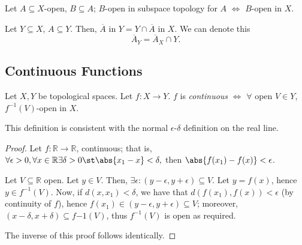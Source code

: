 \begin{lemma}
    Let $A \subseteq X$-open, $B \subseteq A$; $B$-open in subspace topology for $A$ $\iff$ $B$-open in $X$.
\end{lemma}

\begin{lemma}
    Let $Y \subseteq X$, $A\subseteq Y$. Then, $\overline{A}$ in $Y = Y \cap \overline{A}$ in $X$. We can denote this \[
    \overline{A}_Y = \overline{A}_X  \cap Y.   
    \]
\end{lemma}

\subsection{Continuous Functions}

\begin{definition}
    Let $X, Y$ be topological spaces. Let $f: X \to Y$. $f$ is \emph{continuous} $\iff$ $\forall$ open $V \in Y$, $f^{-1}(V)$-open in $X$.
\end{definition}


\begin{proposition}
    This definition is consistent with the normal $\epsilon$-$\delta$ definition on the real line.
\end{proposition}

\begin{proof}
    Let $f: \mathbb{R} \to \mathbb{R}$, continuous; that is, $\forall \epsilon > 0, \forall x \in \mathbb{R} \exists \delta > 0 \st \abs{x_1 - x} < \delta, $ then $\abs{f(x_1) - f(x)} < \epsilon$.

    Let $V \subseteq \mathbb{R}$ open. Let $y \in V$. Then, $\exists \epsilon : (y - \epsilon, y + \epsilon) \subseteq V$. Let $y = f(x)$, hence $y \in f^{-1}(V)$. Now, if $d(x, x_1) < \delta$, we have that $d(f(x_1), f(x)) < \epsilon$ (by continuity of $f$), hence $f(x_1) \in (y - \epsilon, y + \epsilon) \subseteq V$; moreover, $(x - \delta, x + \delta) \subseteq f{-1}(V)$, thus $f^{-1}(V)$ is open as required.

    The inverse of this proof follows identically.
\end{proof}